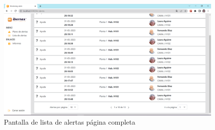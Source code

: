\begin{landscape}
\begin{figure}[!ht]
    \centering
    \includegraphics[width=25cm]{Imagenes/list-pag1.PNG}
    \caption{Pantalla de lista de alertas página completa}
    \label{fig:list-completa}
\end{figure}
\end{landscape}